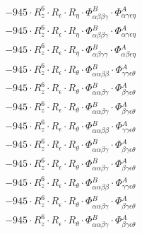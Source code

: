\documentclass{article}
\begin{document}
\begin{subequations}
\begin{gather}
\begin{array}{c}
 \\[0.2em] 		 - 945 \cdot R_{z}^{6} \cdot R_{\epsilon{}} \cdot R_{\eta{}} \cdot \Phi{}^{B}_{\alpha{}\beta{}\beta{}\gamma{}} \cdot \Phi{}^{A}_{\alpha{}\gamma{}\epsilon{}\eta{}} 
 \\[0.2em] 		 - 945 \cdot R_{z}^{6} \cdot R_{\epsilon{}} \cdot R_{\eta{}} \cdot \Phi{}^{B}_{\alpha{}\beta{}\beta{}\gamma{}} \cdot \Phi{}^{A}_{\alpha{}\gamma{}\epsilon{}\eta{}} 
 \\[0.2em] 		 - 945 \cdot R_{z}^{6} \cdot R_{\epsilon{}} \cdot R_{\eta{}} \cdot \Phi{}^{B}_{\alpha{}\beta{}\gamma{}\gamma{}} \cdot \Phi{}^{A}_{\alpha{}\beta{}\epsilon{}\eta{}} 
 \\[0.2em] 		 - 945 \cdot R_{z}^{6} \cdot R_{\epsilon{}} \cdot R_{\theta{}} \cdot \Phi{}^{B}_{\alpha{}\alpha{}\beta{}\beta{}} \cdot \Phi{}^{A}_{\gamma{}\gamma{}\epsilon{}\theta{}} 
 \\[0.2em] 		 - 945 \cdot R_{z}^{6} \cdot R_{\epsilon{}} \cdot R_{\theta{}} \cdot \Phi{}^{B}_{\alpha{}\alpha{}\beta{}\gamma{}} \cdot \Phi{}^{A}_{\beta{}\gamma{}\epsilon{}\theta{}} 
 \\[0.2em] 		 - 945 \cdot R_{z}^{6} \cdot R_{\epsilon{}} \cdot R_{\theta{}} \cdot \Phi{}^{B}_{\alpha{}\alpha{}\beta{}\gamma{}} \cdot \Phi{}^{A}_{\beta{}\gamma{}\epsilon{}\theta{}} 
 \\[0.2em] 		 - 945 \cdot R_{z}^{6} \cdot R_{\epsilon{}} \cdot R_{\theta{}} \cdot \Phi{}^{B}_{\alpha{}\alpha{}\beta{}\beta{}} \cdot \Phi{}^{A}_{\gamma{}\gamma{}\epsilon{}\theta{}} 
 \\[0.2em] 		 - 945 \cdot R_{z}^{6} \cdot R_{\epsilon{}} \cdot R_{\theta{}} \cdot \Phi{}^{B}_{\alpha{}\alpha{}\beta{}\gamma{}} \cdot \Phi{}^{A}_{\beta{}\gamma{}\epsilon{}\theta{}} 
 \\[0.2em] 		 - 945 \cdot R_{z}^{6} \cdot R_{\epsilon{}} \cdot R_{\theta{}} \cdot \Phi{}^{B}_{\alpha{}\alpha{}\beta{}\gamma{}} \cdot \Phi{}^{A}_{\beta{}\gamma{}\epsilon{}\theta{}} 
 \\[0.2em] 		 - 945 \cdot R_{z}^{6} \cdot R_{\epsilon{}} \cdot R_{\theta{}} \cdot \Phi{}^{B}_{\alpha{}\alpha{}\beta{}\beta{}} \cdot \Phi{}^{A}_{\gamma{}\gamma{}\epsilon{}\theta{}} 
 \\[0.2em] 		 - 945 \cdot R_{z}^{6} \cdot R_{\epsilon{}} \cdot R_{\theta{}} \cdot \Phi{}^{B}_{\alpha{}\alpha{}\beta{}\gamma{}} \cdot \Phi{}^{A}_{\beta{}\gamma{}\epsilon{}\theta{}} 
 \\[0.2em] 		 - 945 \cdot R_{z}^{6} \cdot R_{\epsilon{}} \cdot R_{\theta{}} \cdot \Phi{}^{B}_{\alpha{}\alpha{}\beta{}\gamma{}} \cdot \Phi{}^{A}_{\beta{}\gamma{}\epsilon{}\theta{}} 

\end{array}
\end{gather}
\end{subequations}
\end{document}
